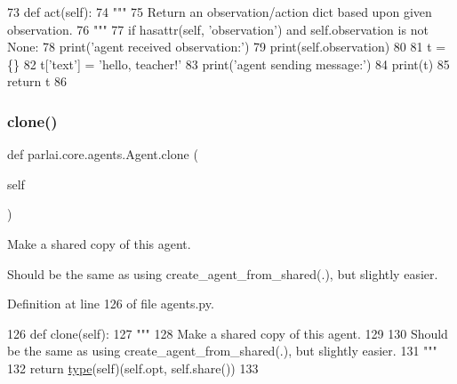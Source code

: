 \begin{DoxyCode}
73     \textcolor{keyword}{def }act(self):
74         \textcolor{stringliteral}{"""}
75 \textcolor{stringliteral}{        Return an observation/action dict based upon given observation.}
76 \textcolor{stringliteral}{        """}
77         \textcolor{keywordflow}{if} hasattr(self, \textcolor{stringliteral}{'observation'}) \textcolor{keywordflow}{and} self.observation \textcolor{keywordflow}{is} \textcolor{keywordflow}{not} \textcolor{keywordtype}{None}:
78             print(\textcolor{stringliteral}{'agent received observation:'})
79             print(self.observation)
80 
81         t = \{\}
82         t[\textcolor{stringliteral}{'text'}] = \textcolor{stringliteral}{'hello, teacher!'}
83         print(\textcolor{stringliteral}{'agent sending message:'})
84         print(t)
85         \textcolor{keywordflow}{return} t
86 
\end{DoxyCode}
\mbox{\label{classparlai_1_1core_1_1agents_1_1Agent_a2525db5bdd19a3bf5b0669bfa158f9ff}} 
\subsubsection{\texorpdfstring{clone()}{clone()}}
{\footnotesize\ttfamily def parlai.\+core.\+agents.\+Agent.\+clone (\begin{DoxyParamCaption}\item[{}]{self }\end{DoxyParamCaption})}

\begin{DoxyVerb}Make a shared copy of this agent.

Should be the same as using create_agent_from_shared(.), but slightly easier.
\end{DoxyVerb}
 

Definition at line 126 of file agents.\+py.


\begin{DoxyCode}
126     \textcolor{keyword}{def }clone(self):
127         \textcolor{stringliteral}{"""}
128 \textcolor{stringliteral}{        Make a shared copy of this agent.}
129 \textcolor{stringliteral}{}
130 \textcolor{stringliteral}{        Should be the same as using create\_agent\_from\_shared(.), but slightly easier.}
131 \textcolor{stringliteral}{        """}
132         \textcolor{keywordflow}{return} \hyperlink{namespaceparlai_1_1agents_1_1tfidf__retriever_1_1build__tfidf_ad5dfae268e23f506da084a9efb72f619}{type}(self)(self.opt, self.share())
133 
\end{DoxyCode}
\mbox{\label{classparlai_1_1core_1_1agents_1_1Agent_a40157e237ea85d75ebc3fd248c7a1a1b}} 
